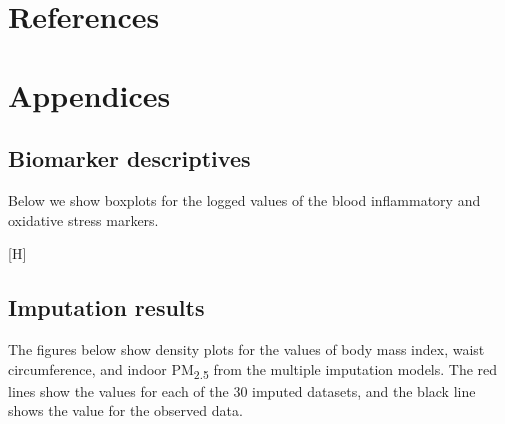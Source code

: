 \documentclass[
  letterpaper,
  DIV=11,
  numbers=noendperiod]{scrartcl}
\makeatletter
\renewenvironment{figure}%
   {\renewcommand\familydefault\sfdefault
    \@float{figure}}
   {\end@float}
\makeatother
\begin{document}
\section{References}\label{references}

\newpage
\appendix
\renewcommand{\thefigure}{A\arabic{figure}}
\renewcommand{\thetable}{A\arabic{table}}
\setcounter{figure}{0}
\setcounter{table}{0}

\section{Appendices}\label{appendices}

\subsection{Biomarker descriptives}\label{biomarker-descriptives}

Below we show boxplots for the logged values of the blood inflammatory
and oxidative stress markers.

\begin{figure}[H]


\caption{\label{fig-afig-biomarkers}Boxplots for markers of systemic
inflammation including C-reactive protein (CRP), interleukin-6 (IL-6),
tumour necrosis factor alpha (TNF-\(\alpha\)) and markers of oxidative
stress including 8-hydroxy-2'-deoxyguanosine (8-OHdG) and
malondialdehyde (MDA)}

\end{figure}%

\newpage

\subsection{Imputation results}\label{imputation-results}

The figures below show density plots for the values of body mass index,
waist circumference, and indoor PM\textsubscript{2.5} from the multiple
imputation models. The red lines show the values for each of the 30
imputed datasets, and the black line shows the value for the observed
data.
\end{document}
